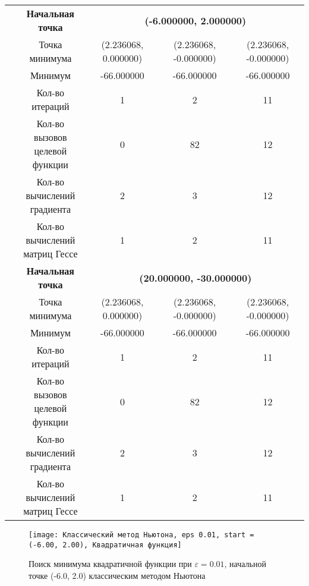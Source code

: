 \begin{table}[H]
\begin{tabular}{|c|c|c|c|c|}
	\cline{2-5}
	\hline
	\multirow{12}{*}{\rotatebox[origin=c]{90}{$\varepsilon = 1e-06$}}&\textbf{Начальная точка} &\multicolumn{3}{c|}{\textbf{(-6.000000, 2.000000)}}\\
	\cline{2-5}
	&Точка минимума &(2.236068, 0.000000) &(2.236068, -0.000000) &(2.236068, -0.000000) \\ 
	\cline{2-5}
	&Минимум &-66.000000 &-66.000000 &-66.000000 \\ 
	\cline{2-5}
	&Кол-во итераций &1 &2 &11 \\ 
	\cline{2-5}
	&\makecell{Кол-во вызовов\\целевой функции} &0 &82 &12 \\ 
	\cline{2-5}
	&\makecell{Кол-во вычислений\\градиента} &2 &3 &12 \\ 
	\cline{2-5}
	&\makecell{Кол-во вычислений\\матриц Гессе} &1 &2 &11 \\ 
	\cline{2-5}
\cline{2-5}&\textbf{Начальная точка} &\multicolumn{3}{c|}{\textbf{(20.000000, -30.000000)}}\\
	\cline{2-5}
	&Точка минимума &(2.236068, 0.000000) &(2.236068, -0.000000) &(2.236068, -0.000000) \\ 
	\cline{2-5}
	&Минимум &-66.000000 &-66.000000 &-66.000000 \\ 
	\cline{2-5}
	&Кол-во итераций &1 &2 &11 \\ 
	\cline{2-5}
	&\makecell{Кол-во вызовов\\целевой функции} &0 &82 &12 \\ 
	\cline{2-5}
	&\makecell{Кол-во вычислений\\градиента} &2 &3 &12 \\ 
	\cline{2-5}
	&\makecell{Кол-во вычислений\\матриц Гессе} &1 &2 &11 \\ 
	\cline{2-5}
	\hline

\end{tabular}
\end{table}


            \begin{figure}[H]
	        \centering
	        \texttt{[image: Классический метод Ньютона, eps 0.01, start = (-6.00, 2.00), Квадратичная функция]}%
	        \caption{Поиск минимума квадратичной функции при $\varepsilon = 0.01$, начальной точке (-6.0, 2.0) классическим методом Ньютона}
	        \vspace*{-1.2cm}
            \end{figure}
            
